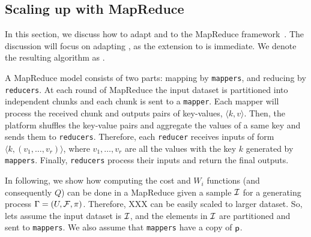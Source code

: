 %
%
%
%
\subsection{Scaling up with MapReduce}\label{sec:mapreduce}
In this section, we discuss how to adapt \algoname and \algonameapx to the
MapReduce framework~\citep{dean2008mapreduce}. The discussion will focus on
adapting \algonameapx, as the extension to \algoname is immediate. We denote the
resulting algorithm as \algonamemr.

A MapReduce model consists of two parts: mapping by \texttt{mappers}, and
reducing by \texttt{reducers}. At each round of MapReduce the input dataset is
partitioned into independent chunks and each chunk is sent to a \texttt{mapper}.
Each mapper will process the received chunk and outputs pairs of key-values,
$\langle k, v \rangle$. Then, the  platform shuffles the key-value pairs and
aggregate the values of a same key and sends them to \texttt{reducers}.
Therefore, each \texttt{reducer} receives inputs of form $\langle k, (v_1,
\ldots, v_r) \rangle$, where $v_1, \ldots, v_r$ are all the values with the key
$k$ generated by \texttt{mappers}. Finally, \texttt{reducers} process their
inputs and return the final outputs.

In following, we show how computing the cost and $W_i$ functions (and
consequently $Q$)  can be done in a MapReduce given a sample $\mathcal{I}$ for a
generating process $\Gamma=(U,\mathcal{F},\pi)$. Therefore, XXX can be easily scaled to larger dataset.
So, lets assume the input dataset is $\mathcal{I}$, and the elements in $\mathcal{I}$ are partitioned and sent to \texttt{mappers}. We also assume that \texttt{mappers} have a copy of $\mathsf{p}$.


